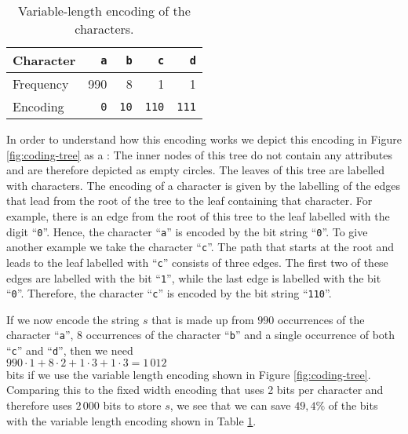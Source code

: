 \begin{table}[htbp]
  \centering
\begin{tabular}[t]{|l|r|r|r|r|}
\hline
Character  & \texttt{a} & \texttt{b}  & \texttt{c}   & \texttt{d}   \\
\hline
\hline
Frequency &     990    &         8   &           1  &         1    \\
\hline
Encoding  & \texttt{0} & \texttt{10} & \texttt{110} & \texttt{111} \\
\hline
\end{tabular}
  \caption{Variable-length encoding of the characters.}
  \label{tab:coding}
\end{table}
In order to understand how this encoding works we depict this encoding in Figure
 \ref{fig:coding-tree} as a  :  The inner nodes of this tree do not contain any attributes
 and are therefore depicted as empty circles.  The leaves of this tree are labelled with characters.
The encoding of a character is given by the labelling of the edges that lead from the root of the tree to the
leaf containing that character.  For example, there is an edge from the root of this tree to the leaf labelled
with the digit ``\texttt{0}''.  Hence, the character ``\texttt{a}'' is encoded by the bit string ``\texttt{0}''.
To give another example we take the character ``\texttt{c}''.   The path that starts at the root and leads to
the leaf labelled with ``\texttt{c}'' consists of three edges.  The first two of these edges are labelled with
the bit ``\texttt{1}'', while the last edge is labelled with the bit ``\texttt{0}''.  Therefore, the character
 ``\texttt{c}'' is encoded by the bit string ``\texttt{110}''.

If we now encode the string $s$ that is made up from  $990$ occurrences of the character
``\texttt{a}'', $8$ occurrences of the character ``\texttt{b}'' and a single occurrence of both ``\texttt{c}''
and ``\texttt{d}'', then we need
\\[0.2cm]
\hspace*{1.3cm}
$990 \cdot 1 + 8 \cdot 2 + 1 \cdot 3 + 1 \cdot 3 = 1\,012$
\\[0.2cm]
bits if we use the variable length encoding shown in Figure \ref{fig:coding-tree}.  Comparing this to the fixed
width encoding that uses 2 bits per character and therefore uses $2\,000$ bits to store $s$, we see that we can
save $49,4\%$ of the bits with the variable length encoding shown in Table \ref{tab:coding}.


